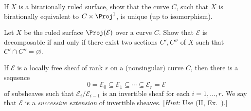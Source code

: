 {\Exercises
{\fontsize{9}{10.6}\selectfont\setlength{\parskip}{0pt}
\begin{description}[style=multiline,labelwidth=1.8em,leftmargin=2.15em,itemsep=3pt,topsep=0pt,parsep=0pt]
\item[\hypertarget{ex-V-2.1}{}2.1.] If $X$ is a birationally ruled surface, show that the curve $C$, such that $X$ is birationally equivalent to $C\times\Proj^1$, is unique (up to isomorphism).
\item[\hypertarget{ex-V-2.2}{}2.2.] Let $X$ be the ruled surface $\Proj(\mathcal E)$ over a curve $C$. Show that $\mathcal E$ is decomposable if and only if there exist two sections $C',C''$ of $X$ such that $C'\cap C''=\varnothing$.
\item[\hypertarget{ex-V-2.3}{}2.3.]
\begin{parts}
\item If $\mathcal E$ is a locally free sheaf of rank $r$ on a (nonsingular) curve $C$, then there is a sequence
\[
0=\mathcal E_0\subseteq\mathcal E_1\subseteq\cdots\subseteq\mathcal E_r=\mathcal E
\]
of subsheaves such that $\mathcal E_i/\mathcal E_{i-1}$ is an invertible sheaf for each $i=1,\ldots,r$. We say that $\mathcal E$ is a \emph{successive extension} of invertible sheaves. [\emph{Hint:} Use (II, Ex.~).]
\end{parts}
\end{description}
}
}

